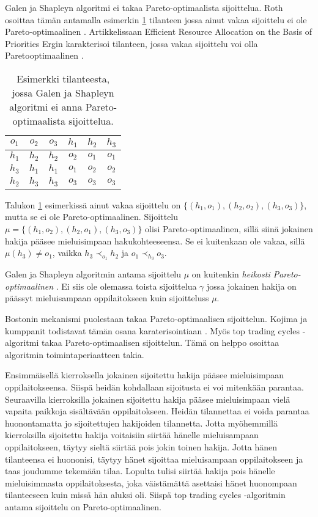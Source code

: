 \documentclass[gradu, twoside]{tktltiki}
\begin{document}
Galen ja Shapleyn algoritmi ei takaa Pareto-optimaalista sijoittelua.
Roth osoittaa tämän antamalla esimerkin \ref{roth_optimaalisuus}
tilanteen jossa ainut vakaa sijoittelu ei ole Pareto-optimaalinen
\cite{roth82}. Artikkelissaan Efficient Resource Allocation on the
Basis of Priorities Ergin karakterisoi tilanteen, jossa vakaa
sijoittelu voi olla Pareto\hyph optimaalinen \cite{ergin02}.

\begin{table}[h]
  \begin{center}
    \begin{tabular}{ c c c | c c c }
      $o_1$ & $o_2$ & $o_3$ & $h_1$ & $h_2$ & $h_3$ \\
      \hline
      $h_1$ & $h_2$ & $h_2$ & $o_2$ & $o_1$ & $o_1$ \\
      $h_3$ & $h_1$ & $h_1$ & $o_1$ & $o_2$ & $o_2$ \\
      $h_2$ & $h_3$ & $h_3$ & $o_3$ & $o_3$ & $o_3$
    \end{tabular}
    \caption{Esimerkki tilanteesta, jossa Galen ja Shapleyn algoritmi ei
      anna Pareto-optimaalista sijoittelua.}
    \label{roth_optimaalisuus}
  \end{center}
\end{table}

Talukon \ref{roth_optimaalisuus} esimerkissä ainut vakaa sijoittelu on
$\{(h_1, o_1), (h_2, o_2), (h_3, o_3)\}$, mutta se ei ole
Pareto-optimaalinen. Sijoittelu $\mu = \{(h_1, o_2), (h_2, o_1), (h_3,
o_3)\}$ olisi Pareto-optimaalinen, sillä siinä jokainen hakija pääsee
mieluisimpaan hakukohteeseensa. Se ei kuitenkaan ole vakaa, sillä
$\mu(h_3) \neq o_1$, vaikka $h_3 \prec_{o_1} h_2$ ja $o_1 \prec_{h_3}
o_3$.

Galen ja Shapleyn algoritmin antama sijoittelu $\mu$ on kuitenkin
\emph{heikosti Pareto-optimaalinen} \cite{gusfield89}. Ei siis ole
olemassa toista sijoittelua $\gamma$ jossa jokainen hakija on päässyt
mieluisampaan oppilaitokseen kuin sijoitteluss $\mu$.

Bostonin mekanismi puolestaan takaa Pareto-optimaalisen sijoittelun.
Kojima ja kumppanit todistavat tämän osana karaterisointiaan
\cite{kojima10}. Myös top trading cycles -algoritmi takaa
Pareto-optimaalisen sijoittelun. Tämä on helppo osoittaa algoritmin
toimintaperiaatteen takia.

Ensimmäisellä kierroksella jokainen sijoitettu hakija pääsee
mieluisimpaan oppilaitokseensa. Siispä heidän kohdallaan sijoitusta ei
voi mitenkään parantaa. Seuraavilla kierroksilla jokainen sijoitettu
hakija pääsee mieluisimpaan vielä vapaita paikkoja sisältävään
oppilaitokseen. Heidän tilannettaa ei voida parantaa huonontamatta jo
sijoitettujen hakijoiden tilannetta. Jotta myöhemmillä kierroksilla
sijoitettu hakija voitaisiin siirtää hänelle mieluisampaan
oppilaitokseen, täytyy sieltä siirtää pois jokin toinen hakija. Jotta
hänen tilanteensa ei huononisi, täytyy hänet sijoittaa mieluisampaan
oppilaitokseen ja taas joudumme tekemään tilaa. Lopulta tulisi siirtää
hakija pois hänelle mieluisimmasta oppilaitoksesta, joka väistämättä
asettaisi hänet huonompaan tilanteeseen kuin missä hän aluksi oli.
Siispä top trading cycles -algoritmin antama sijoittelu on
Pareto-optimaalinen.
\end{document}
